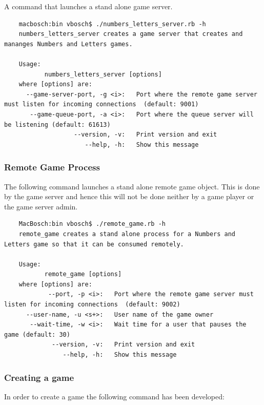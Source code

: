 \documentclass[a4paper,10pt,titlepage]{article}
\begin{document}
\par A command that launches a stand alone game server.

{\footnotesize\begin{verbatim}
	macbosch:bin vbosch$ ./numbers_letters_server.rb -h
	numbers_letters_server creates a game server that creates and mananges Numbers and Letters games.

	Usage:
	       numbers_letters_server [options]
	where [options] are:
	  --game-server-port, -g <i>:   Port where the remote game server must listen for incoming connections  (default: 9001)
	   --game-queue-port, -a <i>:   Port where the queue server will be listening (default: 61613)
	               --version, -v:   Print version and exit
	                  --help, -h:   Show this message
\end{verbatim}}

\subsubsection{Remote Game Process}

\par The following command launches a stand alone remote game object. This is done by the game server and hence this will not be done neither by a game player or the game server admin. 

{\footnotesize\begin{verbatim}
	MacBosch:bin vbosch$ ./remote_game.rb -h
	remote_game creates a stand alone process for a Numbers and Letters game so that it can be consumed remotely.

	Usage:
	       remote_game [options]
	where [options] are:
	        --port, -p <i>:   Port where the remote game server must listen for incoming connections  (default: 9002)
	  --user-name, -u <s+>:   User name of the game owner
	   --wait-time, -w <i>:   Wait time for a user that pauses the game (default: 30)
	         --version, -v:   Print version and exit
	            --help, -h:   Show this message
\end{verbatim}}

\subsubsection{Creating a game}

\par In order to create a game the following command has been developed:
\end{document}

